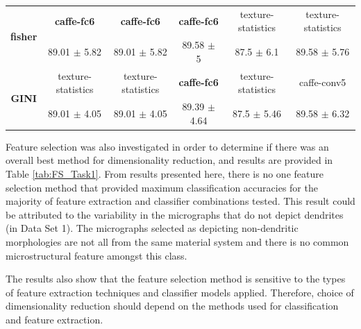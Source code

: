 \begin{table}[H]
{\begin{tabular}{|c|c|c|c|c|c|}
\multirow{2}{*}{\textbf{fisher}}	&	\textbf{caffe-fc6}	&	\textbf{caffe-fc6}	&	\textbf{caffe-fc6}	&	texture-statistics 	&	texture-statistics 	\\	
	&	89.01 $\pm$ 5.82	&	 89.01 $\pm$ 5.82	&	89.58 $\pm$ 5	&	87.5 $\pm$ 6.1	&	89.58 $\pm$ 5.76	\\	\hline
\multirow{2}{*}{\textbf{GINI}}	&	texture-statistics 	&	texture-statistics 	&	\textbf{caffe-fc6}	&	texture-statistics 	&	caffe-conv5 	\\	
	&	89.01 $\pm$ 4.05	&	89.01 $\pm$ 4.05	&	89.39 $\pm$ 4.64	&	87.5 $\pm$ 5.46	&	89.58 $\pm$ 6.32	\\	\hline




\end{tabular}}
\end{table}

Feature selection was also investigated in order to determine if there was an overall best method for dimensionality reduction, and results are provided in Table \ref{tab:FS_Task1}.  From results presented here, there is no one feature selection method that provided maximum classification accuracies for the majority of feature extraction and classifier combinations tested.  This result could be attributed to the variability in the micrographs that do not depict dendrites (in Data Set 1).  The micrographs selected as depicting non-dendritic morphologies are not all from the same material system and there is no common microstructural feature amongst this class. 

The results also show that the feature selection method is sensitive to the types of feature extraction techniques and classifier models applied. Therefore, choice of dimensionality reduction should depend on the methods used for classification and feature extraction.

